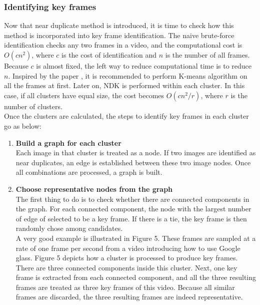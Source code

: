 \subsubsection{Identifying key frames} 
Now that near duplicate method is introduced, it is time to check how this method is incorporated into key frame identification. The naive brute-force identification checks any two frames in a video, and the computational cost is $O(cn^2)$, where $c$ is the cost of identification and $n$ is the number of all frames. Because $c$ is almost fixed, the left way to reduce computational time is to reduce $n$. Inspired by the paper \cite{wang2012event}, it is recommended to perform K-means algorithm on all the frames at first. Later on, NDK is performed within each cluster. In this case, if all clusters have equal size, the cost becomes $O(cn^2/r)$, where $r$ is the number of clusters.\\

\noindent Once the clusters are calculated, the steps to identify key frames in each cluster go as below:

\begin{enumerate}
  \item{\bfseries Build a graph for each cluster}\\
  Each image in that cluster is treated as a node. If two images are identified as near duplicates, an edge is established between these two image nodes. Once all combinations are processed, a graph is built.

  \item{\bfseries Choose representative nodes from the graph}\\
  The first thing to do is to check whether there are connected components in the graph. For each connected component, the node with the largest number of edge of selected to be a key frame. If there is a tie, the key frame is then randomly chose among candidates. \\

  A very good example is illustrated in Figure 5. These frames are sampled at a rate of one frame per second from a video introducing how to use Google glass. Figure 5 depicts how a cluster is processed to produce key frames. There are three connected components inside this cluster. Next, one key frame is extracted from each connected component, and all the three resulting frames are treated as three key frames of this video. Because all similar frames are discarded, the three resulting frames are indeed representative. 

\end{enumerate}

